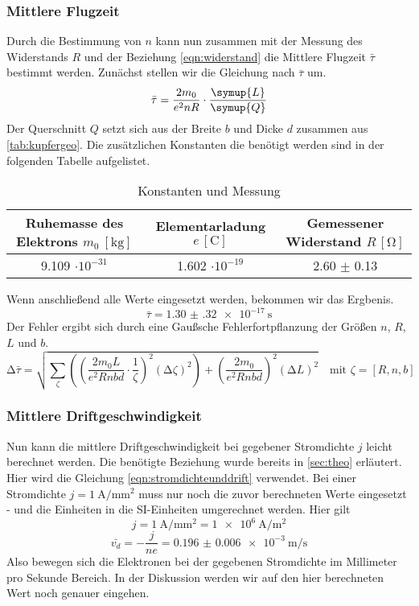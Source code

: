 \subsubsection{Mittlere Flugzeit}
Durch die Bestimmung von $n$ kann nun zusammen mit der Messung des Widerstands $R$ und der Beziehung \eqref{eqn:widerstand} die Mittlere Flugzeit $\bar{\tau}$ bestimmt werden. 
Zunächst stellen wir die Gleichung nach $\bar{\tau}$ um.
\begin{equation}
\bar{\tau} = \frac{2m_{0}}{e^{2}n R} \cdot \frac{\symup{L}}{\symup{Q}}
\end{equation}
Der Querschnitt $Q$ setzt sich aus der Breite $b$ und Dicke $d$ zusammen aus \ref{tab:kupfergeo}.
Die zusätzlichen Konstanten die benötigt werden sind in der folgenden Tabelle aufgelistet.
\begin{table}
  \centering
  \caption{Konstanten und Messung}
  \label{tab:konstantenrechnung}
  \begin{tabular}{c c c}
    Ruhemasse des Elektrons {$m_{0} \: [\si{\kilo\gram}]$} & Elementarladung {$e \, [\si{\coulomb}]$} & Gemessener Widerstand {$R \, [\si{\ohm}]$}\\
    \midrule
    9.109 $\cdot 10^{-31}$   & 1.602 $\cdot 10^{-19}$ & 2.60 $\pm$ 0.13\\
    \bottomrule
  \end{tabular}
\end{table}
Wenn anschließend alle Werte eingesetzt werden, bekommen wir das Ergbenis.
\begin{equation}
\bar{\tau} = \SI{1.30(32)e-17}{\second}
\end{equation}
Der Fehler ergibt sich durch eine Gaußsche Fehlerfortpflanzung der Größen $n$, $R$, $L$ und $b$.
\begin{equation}
\increment \bar{\tau} = \sqrt{\sum_{\zeta}\left( \left( \frac{2m_{0}L}{e^{2}Rnbd} \cdot \frac{1}{\zeta}\right)^{2} (\increment \zeta)^2 \right) + \left( \frac{2m_{0}}{e^{2}Rnbd} \right)^{2} (\increment L)^{2}} \quad \text{mit } \zeta =[R, n, b]
\end{equation}

\subsubsection{Mittlere Driftgeschwindigkeit}
Nun kann die mittlere Driftgeschwindigkeit bei gegebener Stromdichte $j$ leicht berechnet werden. Die benötigte Beziehung wurde bereits in \ref{sec:theo} erläutert.
Hier wird die Gleichung \eqref{eqn:stromdichteunddrift} verwendet. Bei einer Stromdichte $j = \SI{1}{\ampere\per\milli\meter\squared}$ muss nur noch die zuvor berechneten Werte eingesetzt - und
die Einheiten in die SI-Einheiten umgerechnet werden. Hier gilt
\begin{equation}
j = \SI{1}{\ampere\per\milli\meter\squared} = \SI{1e6}{\ampere\per\meter\squared}
\end{equation}
\begin{equation}
\bar{v_{d}} = - \frac{j}{n e} = \SI{0.196(6)e-3}{\meter\per\second}
\end{equation}
Also bewegen sich die Elektronen bei der gegebenen Stromdichte im Millimeter pro Sekunde Bereich. In der Diskussion werden wir auf den 
hier berechneten Wert noch genauer eingehen.

